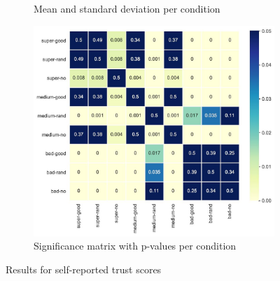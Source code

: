 \begin{figure}[H]
	\begin{subfigure}[b]{0.3\textwidth}
		\caption{Mean and standard deviation per condition}
		\label{tab:results_table_trust}
	\end{subfigure}
	\begin{subfigure}[b]{0.65\textwidth}
		\includegraphics[width=\textwidth]{img/results_matrix_trust2.JPG}
		\caption{Significance matrix with p-values per condition}
		\label{fig:results_matrix_trust}
	\end{subfigure}
	\caption{Results for self-reported trust scores}
	\label{fig:results_trust}
\end{figure}




